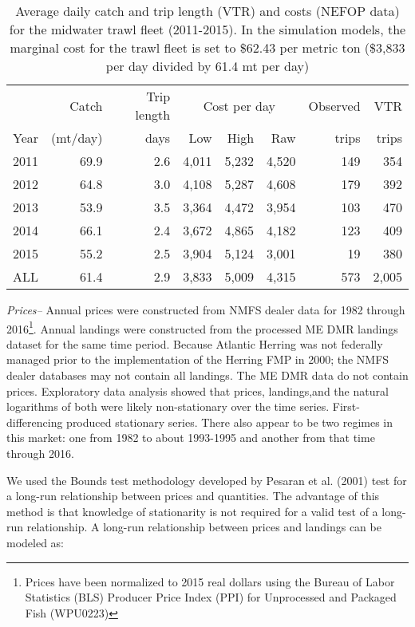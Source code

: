 \documentclass[]{article}
\let\rmarkdownfootnote\footnote%
\def\footnote{\protect\rmarkdownfootnote}
\begin{document}
\begin{table}[htpb]
\begin{centering}
\begin{tabular}{lrrrrrrr}\hline
    &   Catch & Trip length&\multicolumn{3}{c}{Cost per day}    &   Observed    &   VTR \\
Year    &    (mt/day) &days &   Low &   High    &   Raw &    trips  &    trips  \\\hline
2011    &   69.9& 2.6   &   4,011   &   5,232   &   4,520   &   149 &   354 \\
2012    &   64.8& 3.0   &   4,108   &   5,287   &   4,608   &   179 &   392 \\
2013    &   53.9& 3.5   &   3,364   &   4,472   &   3,954   &   103 &   470 \\
2014    &   66.1& 2.4   &   3,672   &   4,865   &   4,182   &   123 &   409 \\
2015    &   55.2&2.5    &   3,904   &   5,124   &   3,001   &   19  &   380 \\
ALL &   61.4    &2.9&   3,833   &   5,009   &   4,315   &   573 &   2,005   \\\hline
\end{tabular}
\caption{Average daily catch and trip length (VTR) and costs (NEFOP data) for the midwater trawl fleet (2011-2015). \label{OTM_costs}In the simulation models, the marginal cost for the trawl fleet is set to \$62.43 per metric ton (\$3,833 per day divided by 61.4 mt per day)}
\end{centering}
\end{table}

\emph{Prices--} Annual prices were constructed from NMFS dealer data for
1982 through 2016\footnote{Prices have been normalized to 2015 real
  dollars using the Bureau of Labor Statistics (BLS) Producer Price
  Index (PPI) for Unprocessed and Packaged Fish (WPU0223)}. Annual
landings were constructed from the processed ME DMR landings dataset for
the same time period. Because Atlantic Herring was not federally managed
prior to the implementation of the Herring FMP in 2000; the NMFS dealer
databases may not contain all landings. The ME DMR data do not contain
prices. Exploratory data analysis showed that prices, landings,and the
natural logarithms of both were likely non-stationary over the time
series. First-differencing produced stationary series. There also appear
to be two regimes in this market: one from 1982 to about 1993-1995 and
another from that time through 2016.

We used the Bounds test methodology developed by Pesaran et al. (2001)
test for a long-run relationship between prices and quantities. The
advantage of this method is that knowledge of stationarity is not
required for a valid test of a long-run relationship. A long-run
relationship between prices and landings can be modeled as:
\end{document}
